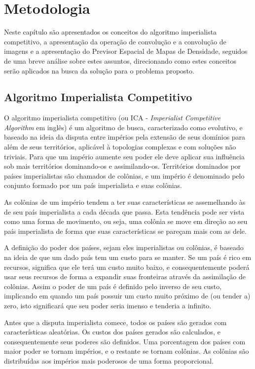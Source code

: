 \chapter{Metodologia}
\label{Metodologia}
%


Neste capítulo são apresentados os conceitos do algoritmo imperialista competitivo, a apresentação da operação de convolução e a convolução de imagens e a apresentação do Previsor Espacial de Mapas de Densidade, seguidos de uma breve análise sobre estes assuntos, direcionando como estes conceitos serão aplicados na busca da solução para o problema proposto.

\section{Algoritmo Imperialista Competitivo}

O algoritmo imperialista competitivo \cite{atashpaz2007imperialist} (ou ICA - \emph{Imperialist Competitive Algorithm} em inglês) é um algoritmo de busca, caracterizado como evolutivo, e baseado na ideia da disputa entre impérios pela extensão de seus domínios para além de seus territórios, aplicável à topologias complexas e com soluções não triviais. Para que um império aumente seu poder ele deve aplicar sua influência sob mais territórios dominando-os e assimilando-os. Territórios dominados por países imperialistas são chamados de colônias, e um império é denominado pelo conjunto formado por um país imperialista e suas colônias.

As colônias de um império tendem a ter suas características se assemelhando às de seu país imperialista a cada década que passa. Esta tendência pode ser vista como uma forma de movimento, ou seja, uma colônia se move em direção ao seu país imperialista de forma que suas características se pareçam mais com as dele.

A definição do poder dos países, sejam eles imperialistas ou colônias, é baseado na ideia de que um dado país tem um custo para se manter. Se um país é rico em recursos, significa que ele terá um custo muito baixo, e consequentemente poderá usar seus recursos de forma a expandir suas fronteiras através da assimilação de colônias. Assim o poder de um país é definido pelo inverso de seu custo, implicando em quando um país possuir um custo muito próximo de (ou tender a) zero, isto significará que seu poder seria imenso e tenderia a infinito.

Antes que a disputa imperialista comece, todos os países são gerados com características aleatórias. Os custos dos países gerados são calculados, e consequentemente seus poderes são definidos. Uma porcentagem dos países com maior poder se tornam impérios, e o restante se tornam colônias. As colônias são distribuídas aos impérios mais poderosos de uma forma proporcional.


